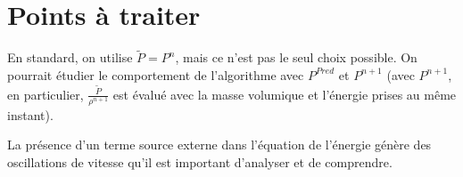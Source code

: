 \section*{Points \`a traiter}




En standard, on utilise $\widetilde{P}=P^n$, mais ce n'est pas le seul choix
possible. On pourrait étudier le comportement de l'algorithme avec $P^{Pred}$ et
$P^{n+1}$ (avec $P^{n+1}$, en particulier,
$\displaystyle\frac{\widetilde{P}}{\rho^{n+1}}$
est évalué avec la masse volumique et l'énergie prises au même instant).

La présence d'un terme source externe dans l'équation de l'énergie génère des
oscillations de vitesse qu'il est important d'analyser et de comprendre.
